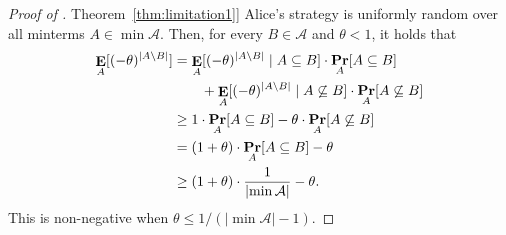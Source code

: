 \documentclass[11pt]{article}
\numberwithin{equation}{section}
\theoremstyle{definition}
\theoremstyle{plain}
\newcommand{\expref}[2]{\hyperref[#2]{#1~\ref{#2}}}
\DeclareMathOperator\pr{\mathop{\bf Pr}}
\DeclareMathOperator\E{\mathop{\bf E}}
\def\calA{\mathcal{A}}
\providecommand\abs[1]{\lvert#1\rvert}
\begin{document}
\begin{proof}[Proof of \expref{Theorem}{thm:limitation1}]
Alice's strategy is uniformly random over all minterms $A \in \min\calA$.  
Then, for every $B \in \calA$ and $\theta<1$, it holds that
  \begin{align*}
  \E_A[(-\theta)^{\abs{A \setminus B}}] &= \E_A[(-\theta)^{\abs{A \setminus B}} \mid A\subseteq B]\cdot \pr_A[A\subseteq B] \\ &\qquad + \E_A[(-\theta)^{\abs{A \setminus B}} \mid A\not\subseteq B]\cdot \pr_A[A\not\subseteq B] \\
	& \geq 1 \cdot \pr_A[A \subseteq B] - \theta \cdot
	\pr_A[A \not\subseteq B]\\ 
	& = (1+\theta)\cdot \pr_A[A \subseteq B] - \theta \\
	& \geq (1+\theta)\cdot \frac{1}{\abs{\min\calA}} - \theta.
	\end{align*}
This is non-negative when $\theta \leq 1/(\abs{\min\calA} - 1)$.
\end{proof}
\end{document}
